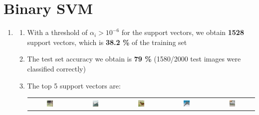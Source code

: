 \documentclass[12pt]{article}
\begin{document}
\clearpage

\section{Binary SVM}

\begin{enumerate}[label=(\alph*)]
    \item \begin{enumerate}[label=\roman*.]
        \item With a threshold of $\alpha_i > 10^{-6}$ for the support vectors, we obtain \textbf{1528} support vectors, which is \textbf{38.2 \%} of the training set
        \item The test set accuracy we obtain is \textbf{79 \%} (1580/2000 test images were classified correctly)
        \item The top 5 support vectors are:

        \begin{tabular}{c c c c c}
            \includegraphics[width=0.15\textwidth]{../Q2/Qa/sv_1.png} &
            \includegraphics[width=0.15\textwidth]{../Q2/Qa/sv_2.png} &
            \includegraphics[width=0.15\textwidth]{../Q2/Qa/sv_3.png} &
            \includegraphics[width=0.15\textwidth]{../Q2/Qa/sv_4.png} &
            \includegraphics[width=0.15\textwidth]{../Q2/Qa/sv_5.png} 
        \end{tabular}


\end{enumerate}
\end{enumerate}
\end{document}
